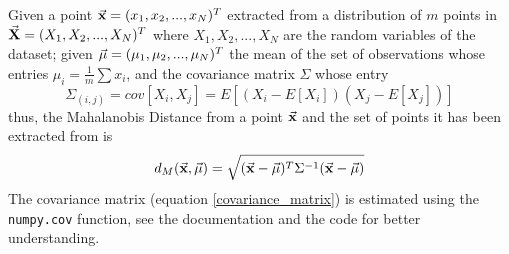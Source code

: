 \documentclass[letterpaper]{article}
\begin{document}
	Given a point $\va{x}=(x_1,x_2,...,x_N)^T$ extracted from a distribution of $m$ points in $\va{X}=(X_1,X_2,...,X_N)^T$ where $X_1,X_2,...,X_N$ are the random variables of the dataset; given $\va{\mu}=(\mu_1,\mu_2,...,\mu_N)^T$ the mean of the set of observations whose entries $\mu_i=\frac{1}{m}\sum{x_i}$, and the covariance matrix $\Sigma$ whose entry \begin{equation} \label{covariance_matrix}
\Sigma_{(i,j)}=cov[X_i,X_j]=E[(X_i-E[X_i])(X_j-E[X_j])]
	\end{equation}
	thus, the Mahalanobis Distance from a point $\va{x}$ and the set of points it has been extracted from is
	\begin{equation}
	d_M(\va{x},\va{\mu})=\sqrt{(\va{x}-\va{\mu})^T\Sigma^{-1}(\va{x}-\va{\mu})}
	\end{equation}
	The covariance matrix (equation \ref{covariance_matrix}) is estimated using the \texttt{numpy.cov} function, see the documentation \cite{numpy.cov} and the code for better understanding.\\
\end{document}
